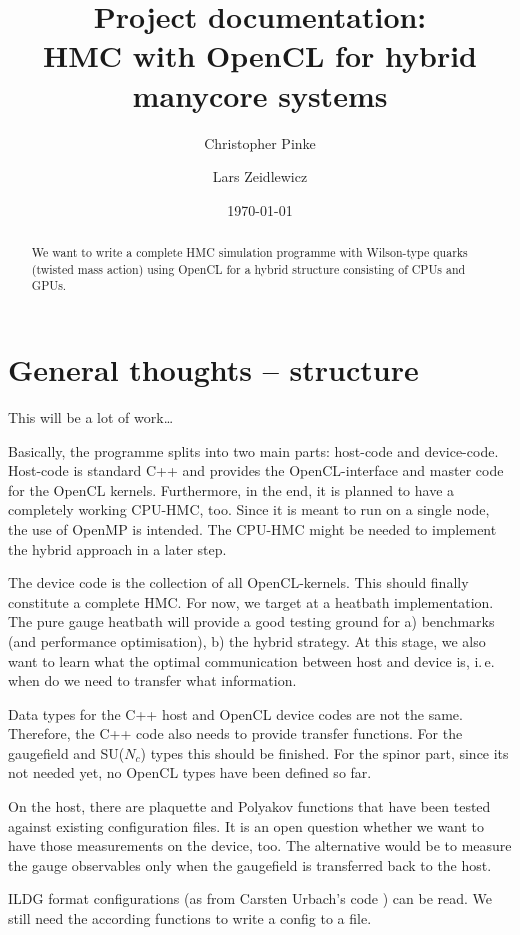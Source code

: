 \documentclass[a4paper,11pt]{article}
\title{Project documentation:\\
       \textbf{HMC with OpenCL for hybrid manycore systems}
}
\author{Christopher Pinke \and Lars Zeidlewicz}
\date{\today}
\begin{document}
\maketitle
\begin{abstract}
We want to write a complete HMC simulation programme with Wilson-type quarks (twisted mass action) using OpenCL for a hybrid structure consisting of CPUs and GPUs.
\end{abstract}

\tableofcontents

\newpage

\section{General thoughts -- structure}
This will be a lot of work\ldots

Basically, the programme splits into two main parts: host-code and device-code. Host-code is standard C++ and provides the OpenCL-interface and master code for the OpenCL kernels. Furthermore, in the end, it is planned to have a completely working CPU-HMC, too. Since it is meant to run on a single node, the use of OpenMP is intended. The CPU-HMC might be needed to implement the hybrid approach in a later step.

The device code is the collection of all OpenCL-kernels. This should finally constitute a complete HMC. For now, we target at a heatbath implementation. The pure gauge heatbath will provide a good testing ground for a) benchmarks (and performance optimisation), b) the hybrid strategy. At this stage, we also want to learn what the optimal communication between host and device is, i.\,e. when do we need to transfer what information.

Data types for the C++ host and OpenCL device codes are not the same. Therefore, the C++ code also needs to provide transfer functions. For the gaugefield and SU($N_c$) types this should be finished. For the spinor part, since its not needed yet, no OpenCL types have been defined so far.

On the host, there are plaquette and Polyakov functions that have been tested against existing configuration files. It is an open question whether we want to have those measurements on the device, too. The alternative would be to measure the gauge observables only when the gaugefield is transferred back to the host.

ILDG format configurations (as from Carsten Urbach's code \cite{Jansen:2009xp}) can be read. We still need the according functions to write a config to a file.
\end{document}
